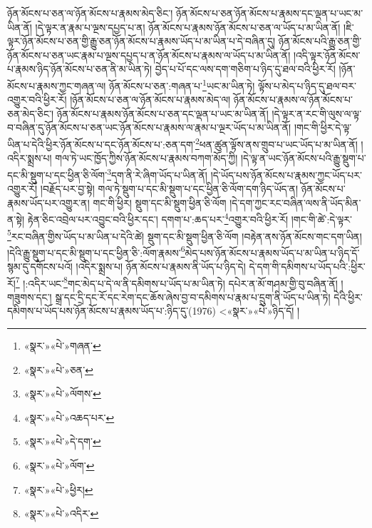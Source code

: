 ཉོན་མོངས་པ་ཅན་ལ་ཉོན་མོངས་པ་རྣམས་མེད་ཅིང་། ཉོན་མོངས་པ་ཅན་ཉོན་མོངས་པ་རྣམས་དང་ལྡན་པ་ཡང་མ་ཡིན་ནོ། །དེ་ལྟར་ན་རྣམ་པ་ལྔས་དཔྱད་པ་ན། ཉོན་མོངས་པ་རྣམས་ཉོན་མོངས་པ་ཅན་ལ་ཡོད་པ་མ་ཡིན་ནོ། །ཇི་ལྟར་ཉོན་མོངས་པ་ཅན་གྱི་རྒྱུ་ཅན་ཉོན་མོངས་པ་རྣམས་ཡོད་པ་མ་ཡིན་པ་དེ་བཞིན་དུ། ཉོན་མོངས་པའི་རྒྱུ་ཅན་གྱི་ཉོན་མོངས་པ་ཅན་ཡང་རྣམ་པ་ལྔས་དཔྱད་པ་ན་ཉོན་མོངས་པ་རྣམས་ལ་ཡོད་པ་མ་ཡིན་ནོ། །འདི་ལྟར་ཉོན་མོངས་པ་རྣམས་ཉིད་ཉོན་མོངས་པ་ཅན་ནི་མ་ཡིན་ཏེ། བྱེད་པ་པོ་དང་ལས་དག་གཅིག་པ་ཉིད་དུ་ཐལ་བའི་ཕྱིར་རོ། །ཉོན་མོངས་པ་རྣམས་ཀྱང་གཞན་ལ། ཉོན་མོངས་པ་ཅན་:གཞན་པ་\footnote{«སྣར་»«པེ་»གཞན་}ཡང་མ་ཡིན་ཏེ། ལྟོས་པ་མེད་པ་ཉིད་དུ་ཐལ་བར་འགྱུར་བའི་ཕྱིར་རོ། །ཉོན་མོངས་པ་ཅན་ལ་ཉོན་མོངས་པ་རྣམས་མེད་ལ། ཉོན་མོངས་པ་རྣམས་ལ་ཉོན་མོངས་པ་ཅན་མེད་ཅིང་། ཉོན་མོངས་པ་རྣམས་ཉོན་མོངས་པ་ཅན་དང་ལྡན་པ་ཡང་མ་ཡིན་ནོ། །དེ་ལྟར་ན་རང་གི་ལུས་ལ་ལྟ་བ་བཞིན་དུ་ཉོན་མོངས་པ་ཅན་ཡང་ཉོན་མོངས་པ་རྣམས་ལ་རྣམ་པ་ལྔར་ཡོད་པ་མ་ཡིན་ནོ། །གང་གི་ཕྱིར་དེ་ལྟ་ཡིན་པ་དེའི་ཕྱིར་ཉོན་མོངས་པ་དང་ཉོན་མོངས་པ་:ཅན་དག་\footnote{«སྣར་»«པེ་»ཅན་}ཕན་ཚུན་ལྟོས་ནས་གྲུབ་པ་ཡང་ཡོད་པ་མ་ཡིན་ནོ། །འདིར་སྨྲས་པ། གལ་ཏེ་ཡང་ཁྱོད་ཀྱིས་ཉོན་མོངས་པ་རྣམས་བཀག་མོད་ཀྱི། །དེ་ལྟ་ན་ཡང་ཉོན་མོངས་པའི་རྒྱུ་སྡུག་པ་དང་མི་སྡུག་པ་དང་ཕྱིན་ཅི་ལོག་\footnote{«སྣར་»«པེ་»ལོགས་}དག་ནི་རེ་ཞིག་ཡོད་པ་ཡིན་ནོ། །དེ་ཡོད་པས་ཉོན་མོངས་པ་རྣམས་ཀྱང་ཡོད་པར་འགྱུར་རོ། །བརྗོད་པར་བྱ་སྟེ། གལ་ཏེ་སྡུག་པ་དང་མི་སྡུག་པ་དང་ཕྱིན་ཅི་ལོག་དག་ཉིད་ཡོད་ན། ཉོན་མོངས་པ་རྣམས་ཡོད་པར་འགྱུར་ན། གང་གི་ཕྱིར། སྡུག་དང་མི་སྡུག་ཕྱིན་ཅི་ལོག །དེ་དག་ཀྱང་རང་བཞིན་ལས་ནི་ཡོད་མིན་ན་སྟེ། རྟེན་ཅིང་འབྲེལ་པར་འབྱུང་བའི་ཕྱིར་དང་། དགག་པ་:ཆད་པར་\footnote{«སྣར་»«པེ་»འཆད་པར་}འགྱུར་བའི་ཕྱིར་རོ། །གང་གི་ཚེ་:དེ་ལྟར་\footnote{«སྣར་»«པེ་»དེ་དག་}རང་བཞིན་གྱིས་ཡོད་པ་མ་ཡིན་པ་དེའི་ཚེ། སྡུག་དང་མི་སྡུག་ཕྱིན་ཅི་ལོག །བརྟེན་ནས་ཉོན་མོངས་གང་དག་ཡིན། །དེའི་རྒྱུ་སྡུག་པ་དང་མི་སྡུག་པ་དང་ཕྱིན་ཅི་:ལོག་རྣམས་\footnote{«སྣར་»«པེ་»ལོག་}མེད་པས་ཉོན་མོངས་པ་རྣམས་ཡོད་པ་མ་ཡིན་པ་ཉིད་དོ་སྙམ་དུ་དགོངས་པའོ། །འདིར་སྨྲས་པ། ཉོན་མོངས་པ་རྣམས་ནི་ཡོད་པ་ཉིད་དེ། དེ་དག་གི་དམིགས་པ་ཡོད་པའི་:ཕྱིར་རོ།\footnote{«སྣར་»«པེ་»ཕྱིར།} །:འདིར་ཡང་\footnote{«སྣར་»«པེ་»འདིར་}གང་མེད་པ་དེ་ལ་ནི་དམིགས་པ་ཡོད་པ་མ་ཡིན་ཏེ། དཔེར་ན་མོ་གཤམ་གྱི་བུ་བཞིན་ནོ། །གཟུགས་དང་། སྒྲ་དང་དྲི་དང་རོ་དང་རེག་དང་ཆོས་ཞེས་བྱ་བ་དམིགས་པ་རྣམ་པ་དྲུག་ནི་ཡོད་པ་ཡིན་ཏེ། དེའི་ཕྱིར་དམིགས་པ་ཡོད་པས་ཉོན་མོངས་པ་རྣམས་ཡོད་པ་:ཉིད་དུ་(1976) <«སྣར་»«པེ་»ཉིད་དོ། །
